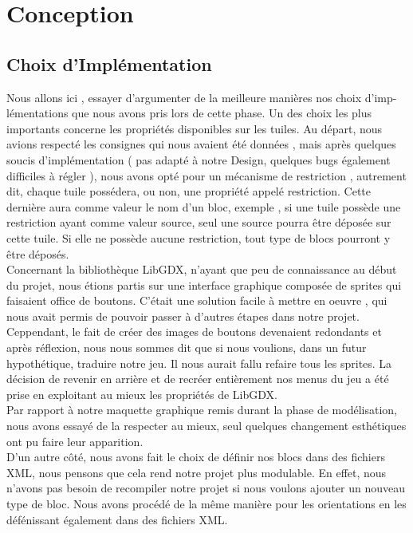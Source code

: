 \documentclass[a4paper,10pt]{article}
\begin{document}
\section{Conception}
\subsection{Choix d'Implémentation}
Nous allons ici , essayer d'argumenter de la meilleure manières nos choix d'imp-\\lémentations que nous avons pris lors de cette phase.
Un des choix les plus importants concerne les propriétés disponibles sur les tuiles. Au départ, nous avions respecté les consignes qui nous
avaient été données , mais après quelques soucis d'implémentation ( pas adapté à notre Design, quelques bugs également difficiles à régler ), nous
avons opté pour un mécanisme de restriction , autrement dit, chaque tuile possédera, ou non, une propriété appelé restriction. Cette dernière aura
comme valeur le nom d'un bloc, exemple , si une tuile possède une restriction ayant comme valeur source, seul une source pourra être déposée sur cette tuile.
Si elle ne possède aucune restriction, tout type de blocs pourront y être déposés. 
\\
Concernant la bibliothèque LibGDX, n'ayant que peu de connaissance au début du projet, nous étions partis sur une interface graphique composée de sprites qui faisaient
office de boutons. C'était une solution facile à mettre en oeuvre , qui nous avait permis de pouvoir passer à d'autres étapes dans notre projet.\\
Ceppendant, le fait de créer des images de boutons devenaient redondants et après réflexion, nous nous sommes dit que si nous voulions, dans un futur
hypothétique, traduire notre jeu. Il nous aurait fallu refaire tous les sprites. La décision de revenir en arrière et de recréer entièrement nos menus 
du jeu a été prise en exploitant au mieux les propriétés de LibGDX. 
\\
Par rapport à notre maquette graphique remis durant la phase de modélisation, nous avons essayé de la respecter au mieux, seul quelques changement
esthétiques ont pu faire leur apparition.
\\
D'un autre côté, nous avons fait le choix de définir nos blocs dans des fichiers XML, nous pensons que cela rend notre projet plus modulable. En effet, nous 
n'avons pas besoin de recompiler notre projet si nous voulons ajouter un nouveau type de bloc. Nous avons procédé de la même manière pour les orientations
en les défénissant également dans des fichiers XML.
\end{document}
